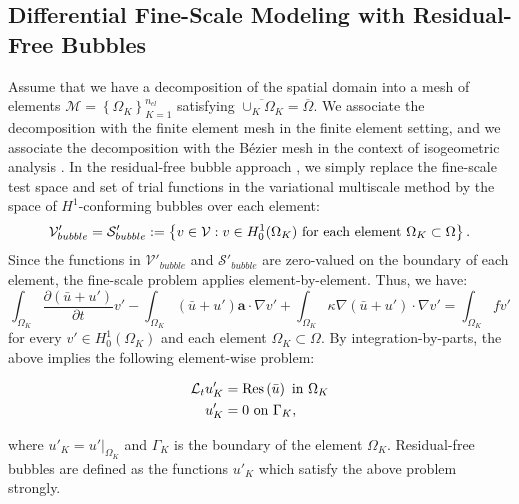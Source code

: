 \documentclass[11pt]{article}
\begin{document}
\subsection{Differential Fine-Scale Modeling with Residual-Free Bubbles}

Assume that we have a decomposition of the spatial domain into a mesh of elements $\mathcal{M} = \left\{ \Omega_K \right\}_{K=1}^{n_{el}}$ satisfying $\overline{\cup_K \Omega_K} = \overline{\Omega}$.  We associate the decomposition with the finite element mesh in the finite element setting, and we associate the decomposition with the B\'{e}zier mesh in the context of isogeometric analysis \cite{Borden11}.  In the residual-free bubble approach \cite{Brezzi92,Brezzi97,Brezzi94}, we simply replace the fine-scale test space and set of trial functions in the variational multiscale method by the space of $H^1$-conforming bubbles over each element:
\begin{equation}
\mathcal{V}'_{bubble} = \mathcal{S}'_{bubble} := \left\{ v \in \mathcal{V}: v \in H^1_0(\Omega_K) \textup{ for each element } \Omega_K \subset \Omega \right\}.
\end{equation}
Since the functions in $\mathcal{V}'_{bubble}$ and $\mathcal{S}'_{bubble}$ are zero-valued on the boundary of each element, the fine-scale problem applies element-by-element.  Thus, we have:
\begin{equation}\label{eq:ad_split_RFB_element}
\int_{\Omega_K} \frac{\partial \left(\bar{u} + u'\right)}{\partial t} v' -  \int_{\Omega_K} \left(\bar{u} + u'\right) \bm{a} \cdot \nabla v' +  \int_{\Omega_K} \kappa \nabla \left(\bar{u} + u'\right) \cdot \nabla v' = \int_{\Omega_K} f v'
\end{equation}
for every $v' \in H^1_0(\Omega_K)$ and each element $\Omega_K \subset \Omega$. By integration-by-parts, the above implies the following element-wise problem:

\begin{dmath} \label{eq:element_fine_RFB}
\begin{aligned}
\mathcal{L}_t u'_K & = \textup{Res}\left(\bar{u}\right)\ \text{in}\ \Omega_K \\
u'_K & = 0\ \text{on}\ \Gamma_K,
\end{aligned}
\end{dmath}

\noindent where $u'_K = u'|_{\Omega_K}$ and  $\Gamma_K$ is the boundary of the element $\Omega_K$.  Residual-free bubbles are defined as the functions $u'_K$ which satisfy the above problem strongly.
\end{document}
